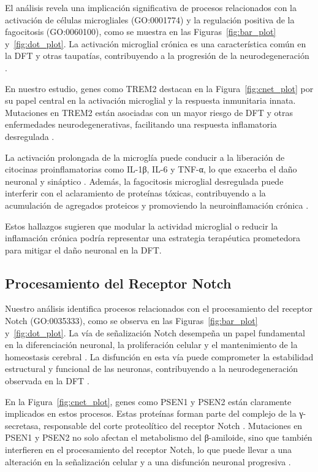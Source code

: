 El análisis revela una implicación significativa de procesos relacionados con la activación de células microgliales (GO:0001774) y la regulación positiva de la fagocitosis (GO:0060100), como se muestra en las Figuras~\ref{fig:bar_plot} y~\ref{fig:dot_plot}. La activación microglial crónica es una característica común en la DFT y otras taupatías, contribuyendo a la progresión de la neurodegeneración \cite{heneka2015neuroinflammation, rajendran2009microglia}.

En nuestro estudio, genes como TREM2 destacan en la Figura~\ref{fig:cnet_plot} por su papel central en la activación microglial y la respuesta inmunitaria innata. Mutaciones en TREM2 están asociadas con un mayor riesgo de DFT y otras enfermedades neurodegenerativas, facilitando una respuesta inflamatoria desregulada \cite{yeh2016trem2, ulland2017trem2}.

La activación prolongada de la microglía puede conducir a la liberación de citocinas proinflamatorias como IL-1β, IL-6 y TNF-α, lo que exacerba el daño neuronal y sináptico \cite{block2007microglia}. Además, la fagocitosis microglial desregulada puede interferir con el aclaramiento de proteínas tóxicas, contribuyendo a la acumulación de agregados proteicos y promoviendo la neuroinflamación crónica \cite{lull2010microglial}.

Estos hallazgos sugieren que modular la actividad microglial o reducir la inflamación crónica podría representar una estrategia terapéutica prometedora para mitigar el daño neuronal en la DFT.


\subsection{Procesamiento del Receptor Notch}

Nuestro análisis identifica procesos relacionados con el procesamiento del receptor Notch (GO:0035333), como se observa en las Figuras~\ref{fig:bar_plot} y~\ref{fig:dot_plot}. La vía de señalización Notch desempeña un papel fundamental en la diferenciación neuronal, la proliferación celular y el mantenimiento de la homeostasis cerebral \cite{kopan2009canonical}. La disfunción en esta vía puede comprometer la estabilidad estructural y funcional de las neuronas, contribuyendo a la neurodegeneración observada en la DFT \cite{abbott2019notch}.

En la Figura~\ref{fig:cnet_plot}, genes como PSEN1 y PSEN2 están claramente implicados en estos procesos. Estas proteínas forman parte del complejo de la γ-secretasa, responsable del corte proteolítico del receptor Notch \cite{de2002presenilins}. Mutaciones en PSEN1 y PSEN2 no solo afectan el metabolismo del β-amiloide, sino que también interfieren en el procesamiento del receptor Notch, lo que puede llevar a una alteración en la señalización celular y a una disfunción neuronal progresiva \cite{sherrington1995cloning}.

